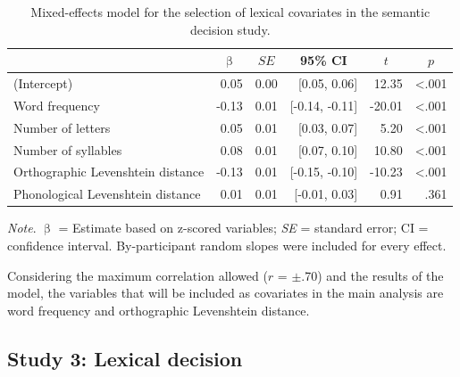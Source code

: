 \documentclass[
  12pt,
  man,floatsintext]{apa7}
\begin{document}
\begin{table}[H]

\caption{\label{tab:semanticdecision-lexical-covariates-selection}Mixed-effects model for the selection of lexical covariates in the semantic decision study.}
\centering
\begin{threeparttable}
\begin{tabular}[t]{lrrrrr}
\toprule
\multicolumn{1}{c}{ } & \multicolumn{1}{c}{$\upbeta$} & \multicolumn{1}{c}{$SE$} & \multicolumn{1}{c}{95\% CI} & \multicolumn{1}{c}{$t$} & \multicolumn{1}{c}{$p$}\\
\midrule
(Intercept) & 0.05 & 0.00 & {}[0.05, 0.06] & 12.35 & <.001\\
Word frequency & -0.13 & 0.01 & {}[-0.14, -0.11] & -20.01 & <.001\\
Number of letters & 0.05 & 0.01 & {}[0.03, 0.07] & 5.20 & <.001\\
Number of syllables & 0.08 & 0.01 & {}[0.07, 0.10] & 10.80 & <.001\\
Orthographic Levenshtein distance & -0.13 & 0.01 & {}[-0.15, -0.10] & -10.23 & <.001\\
Phonological Levenshtein distance & 0.01 & 0.01 & {}[-0.01, 0.03] & 0.91 & .361\\
\bottomrule
\end{tabular}
\begin{tablenotes}
\item \textit{\linebreak} 
\item \textit{Note}. $\upbeta$ = Estimate based on z-scored variables; \textit{SE} = standard error; \linebreak \phantom{.}CI = confidence interval. By-participant random slopes were included for \linebreak \phantom{.}every effect.
\end{tablenotes}
\end{threeparttable}
\end{table}

Considering the maximum correlation allowed (\(r\) = \(\pm\).70) and the results of the model, the variables that will be included as covariates in the main analysis are word frequency and orthographic Levenshtein distance.

\hypertarget{study-3-lexical-decision-1}{%
\subsection{Study 3: Lexical decision}\label{study-3-lexical-decision-1}}
\end{document}
